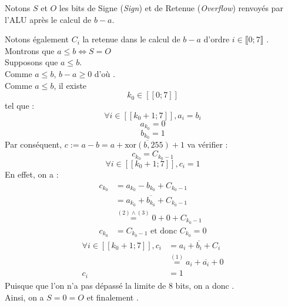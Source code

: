 \documentclass[twoside, 12pt, a4paper]{article}
\begin{document}
        Notons $S$ et $O$ les bits de Signe (\textit{Sign}) et de Retenue (\textit{Overflow}) renvoyés par l'ALU après le calcul de $b-a$.

        Notons également $C_i$ la retenue dans le calcul de $b-a$ d'ordre $i \in \lBrack 0 ; 7 \rBrack$ . \\

        \hspace{-\baselineskip}Montrons que $a \leq b \iff S = O$ \\
        \framebox[1cm][c]{$\implies$} Supposons que $a \leq b$. \\
            Comme $a \leq b$, $b-a \geq 0$ d'où . \\
            Comme $a \leq b$, il existe \[ k_0 \in [\![ 0 ; 7 ]\!] \] tel que : 
                \begin{equation}
                    \forall i \in [\![k_0+1 ; 7]\!], a_i = b_i
                \end{equation}
                \begin{equation}
                    a_{k_0} = 0
                \end{equation}
                \begin{equation}
                    b_{k_0} = 1
                \end{equation}
                Par conséquent, $c := a-b = a + \overline{\text{xor}(b, 255)} + 1$ va vérifier :
                \begin{equation*}
                    c_{k_0} = C_{k_0-1}
                \end{equation*}
                \begin{equation*}
                    \forall i \in [\![k_0+1 ; 7]\!], c_i = 1
                \end{equation*}
                En effet, on a :
                \begin{align*}
                    c_{k_0} &= a_{k_0} - b_{k_0} + C_{k_0-1} 
                    \\ &= a_{k_0} + \overline{b_{k_0}} + C_{k_0-1} 
                    \\ &\overset{(2) \land (3)}{=} 0 + 0 + C_{k_0-1} 
                    \\ c_{k_0} &= C_{k_0-1} \text{ et donc } C_{k_0} = 0
                    \end{align*}
                    \begin{align*}
                    \forall i \in [\![k_0+1 ; 7]\!], c_i &= a_i + \overline{b_i} + C_i \
                    \\ &\overset{(1)}{=} a_i + \overline{a_i} + 0 
                    \\ c_i &= 1
                    \end{align*}
                Puisque que l'on n'a pas dépassé la limite de 8 bits, on a donc . \\     
            Ainsi, on a $S = 0 = O$ et finalement \framebox[1.5cm][c]{$S = O$}. \\
\end{document}
